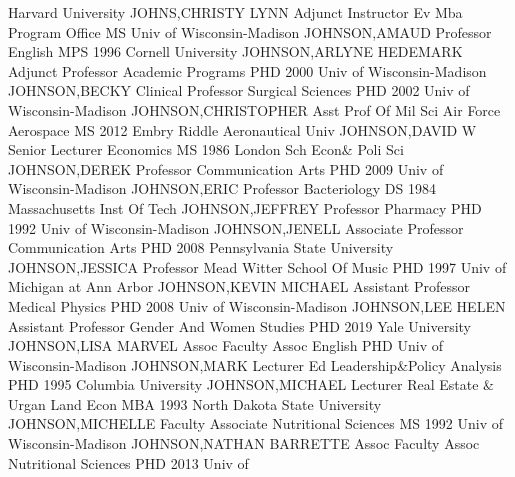 \documentclass[
]{article}
\begin{document}
Harvard University \textbar JOHNS,CHRISTY LYNN \textbar Adjunct
Instructor \textbar{}  \textbar Ev Mba Program Office
\textbar MS Univ of Wisconsin-Madison \textbar JOHNSON,AMAUD
\textbar Professor \textbar{}  \textbar English \textbar MPS
1996 Cornell University \textbar JOHNSON,ARLYNE HEDEMARK
\textbar Adjunct Professor \textbar{}  \textbar Academic
Programs \textbar PHD 2000 Univ of Wisconsin-Madison
\textbar JOHNSON,BECKY \textbar Clinical Professor \textbar{}
 \textbar Surgical Sciences \textbar PHD 2002 Univ of
Wisconsin-Madison \textbar JOHNSON,CHRISTOPHER \textbar Asst Prof Of Mil
Sci \textbar{}  \textbar Air Force Aerospace \textbar MS
2012 Embry Riddle Aeronautical Univ \textbar JOHNSON,DAVID W
\textbar Senior Lecturer \textbar{}  \textbar Economics
\textbar MS 1986 London Sch Econ\& Poli Sci \textbar JOHNSON,DEREK
\textbar Professor \textbar{}  \textbar Communication Arts
\textbar PHD 2009 Univ of Wisconsin-Madison \textbar JOHNSON,ERIC
\textbar Professor \textbar{}  \textbar Bacteriology
\textbar DS 1984 Massachusetts Inst Of Tech \textbar JOHNSON,JEFFREY
\textbar Professor \textbar{}  \textbar Pharmacy
\textbar PHD 1992 Univ of Wisconsin-Madison \textbar JOHNSON,JENELL
\textbar Associate Professor \textbar{} 
\textbar Communication Arts \textbar PHD 2008 Pennsylvania State
University \textbar JOHNSON,JESSICA \textbar Professor \textbar{}
 \textbar Mead Witter School Of Music \textbar PHD 1997 Univ
of Michigan at Ann Arbor \textbar JOHNSON,KEVIN MICHAEL
\textbar Assistant Professor \textbar{}  \textbar Medical
Physics \textbar PHD 2008 Univ of Wisconsin-Madison \textbar JOHNSON,LEE
HELEN \textbar Assistant Professor \textbar{} 
\textbar Gender And Women Studies \textbar PHD 2019 Yale University
\textbar JOHNSON,LISA MARVEL \textbar Assoc Faculty Assoc \textbar{}
 \textbar English \textbar PHD Univ of Wisconsin-Madison
\textbar JOHNSON,MARK \textbar Lecturer \textbar{} 
\textbar Ed Leadership\&Policy Analysis \textbar PHD 1995 Columbia
University \textbar JOHNSON,MICHAEL \textbar Lecturer \textbar{}
 \textbar Real Estate \& Urgan Land Econ \textbar MBA 1993
North Dakota State University \textbar JOHNSON,MICHELLE \textbar Faculty
Associate \textbar{}  \textbar Nutritional Sciences
\textbar MS 1992 Univ of Wisconsin-Madison \textbar JOHNSON,NATHAN
BARRETTE \textbar Assoc Faculty Assoc \textbar{} 
\textbar Nutritional Sciences \textbar PHD 2013 Univ of
\end{document}
